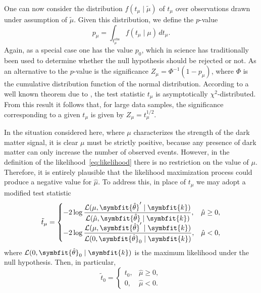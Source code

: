 \documentclass[b5paper, 10pt, twoside]{book}
\renewcommand{\vec}[1]{\symbfit{#1}}
\newcommand{\unitv}[1]{\symbfit{\hat{#1}}}
\newcommand{\difd}{\,d}
\begin{document}
One can now consider the distribution $f(t_\mu\mid\tilde{\mu})$ of $t_\mu$ over observations drawn under assumption of $\tilde{\mu}$. Given this distribution, we define the $p$-value
\begin{equation}
    p_\mu=\int_{t_\mu^\text{obs}}f(t_\mu\mid\mu)\difd t_\mu.
\end{equation}
Again, as a special case one has the value $p_0$, which in science has traditionally been used to determine whether the null hypothesis should be rejected or not. As an alternative to the $p$-value is the significance $Z_\mu=\Phi^{-1}(1-p_\mu)$, where $\Phi$ is the cumulative distribution function of the normal distribution. According to a well known theorem due to \textcite{Wilks1938}, the test statistic $t_\mu$ is asymptotically $\chi^2$-distributed. From this result it follows that, for large data samples, the significance corresponding to a given $t_\mu$ is given by $Z_\mu=t_\mu^{1/2}$.

In the situation considered here, where $\mu$ characterizes the strength of the dark matter signal, it is clear $\mu$ must be strictly positive, because any presence of dark matter can only increase the number of observed events. However, in the definition of the likelihood~\eqref{eq:likelihood} there is no restriction on the value of $\mu$. Therefore, it is entirely plausible that the likelihood maximization process could produce a negative value for $\hat{\mu}$. To address this, in place of $t_\mu$ we may adopt a modified test statistic \parencite{BaxterEtAl2021}
\begin{equation}
    \tilde{t}_\mu=
    \begin{cases}
        \displaystyle-2\log\frac{\mathcal{L}(\mu,\unitv{\theta}'\mid\vec{k})}{\mathcal{L}(\hat{\mu},\unitv{\theta}\mid\vec{k})},&\hat{\mu}\geq0,\\
        \displaystyle-2\log\frac{\mathcal{L}(\mu,\unitv{\theta}'\mid\vec{k})}{\mathcal{L}(0,\unitv{\theta}_0\mid\vec{k})},&\hat{\mu}<0,
    \end{cases}
\end{equation}
where $\mathcal{L}(0,\unitv{\theta}_0\mid\vec{k})$ is the maximum likelihood under the null hypothesis. Then, in particular,
\begin{equation}
    \tilde{t}_0=
    \begin{cases}
        t_0,&\hat{\mu}\geq0,\\
        0,&\hat{\mu}<0.
    \end{cases}
\end{equation}
\end{document}
